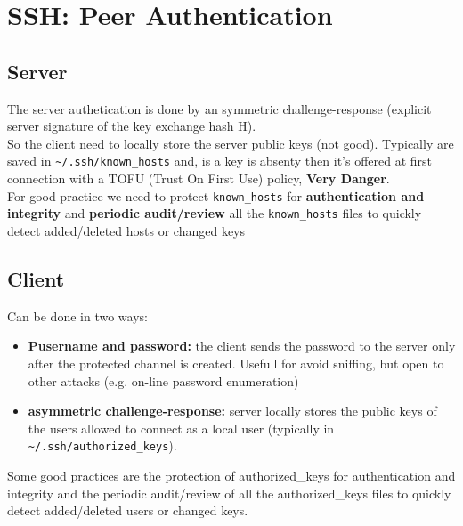 \section{SSH: Peer Authentication}

\subsection{Server}
The server authetication is done by an symmetric challenge-response (explicit server signature of the key exchange hash H). \\
So the client need to locally store the server public keys (not good). Typically are saved in \texttt{\textasciitilde/.ssh/known\_hosts} and, is a key is absenty then it's offered at first connection with a TOFU (Trust On First Use) policy, \textbf{Very Danger}. \\
For good practice we need to protect \texttt{known\_hosts} for \textbf{authentication and integrity} and \textbf{periodic audit/review} all the \texttt{known\_hosts} files to quickly detect added/deleted hosts or changed keys

\subsection{Client}
Can be done in two ways:
\begin{itemize}[itemsep=0pt]
    \item \textbf{Pusername and password:} the client sends the password to the server only after the protected channel is created. Usefull for avoid sniffing, but open to other attacks (e.g. on-line password enumeration)
    \item \textbf{asymmetric challenge-response:} server locally stores the public keys of the users allowed to connect as a local user (typically in \texttt{\textasciitilde/.ssh/authorized\_keys}).
\end{itemize}
Some good practices are the protection of authorized\_keys for authentication and integrity and the periodic audit/review of all the authorized\_keys files to quickly detect added/deleted users or changed keys.